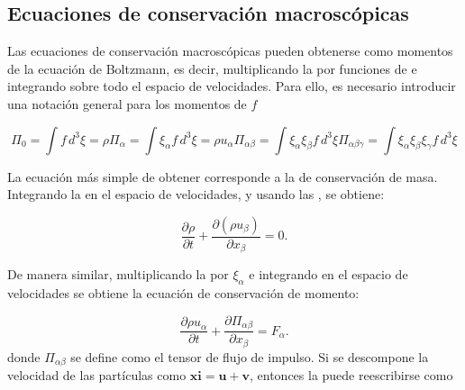 \subsection{Ecuaciones de conservaci\'on macrosc\'opicas}
Las ecuaciones de conservaci\'on macrosc\'opicas pueden obtenerse como momentos de la ecuaci\'on de Boltzmann, es decir, multiplicando la  por funciones de \bxi{} e integrando sobre todo el espacio de velocidades. Para ello, es necesario introducir una notaci\'on general para los momentos de $f$

\begin{subequations}
	\begin{equation}
		\Pi_0 = \int f \, d^3 \xi = \rho
	\end{equation}
	\begin{equation}
		\Pi_{\alpha} = \int \xi_{\alpha} f \, d^3 \xi = \rho u_{\alpha}
	\end{equation}
	\begin{equation}
		\Pi_{\alpha \beta} = \int \xi_{\alpha} \xi_{\beta} f \, d^3 \xi
	\end{equation}
	\begin{equation}
		\Pi_{\alpha \beta \gamma} = \int \xi_{\alpha} \xi_{\beta} \xi_{\gamma} f \, d^3 \xi
	\end{equation}
	\label{eq:f_moments}
\end{subequations}

La ecuaci\'on m\'as simple de obtener corresponde a la de conservaci\'on de masa. Integrando la  en el espacio de velocidades, y usando las , se obtiene:

\begin{equation}
	\dfrac{\partial \rho}{\partial t} + \dfrac{\partial (\rho u_{\beta})}{\partial x_{\beta}} = 0.
\end{equation}

De manera similar, multiplicando la  por $\xi_{\alpha}$ e integrando en el espacio de velocidades se obtiene la ecuaci\'on de conservaci\'on de momento:

\begin{equation}
	\dfrac{\partial \rho u_{\alpha}}{\partial t} + \dfrac{\partial \Pi_{\alpha \beta}}{\partial x_{\beta}} = F_{\alpha}.
	\label{eq:mom_flux}
\end{equation}
donde $\Pi_{\alpha \beta}$ se define como el tensor de flujo de impulso. Si se descompone la velocidad de las part\'iculas como $\bm{xi} = \bm{u} + \bm{v}$, entonces la  puede reescribirse como

